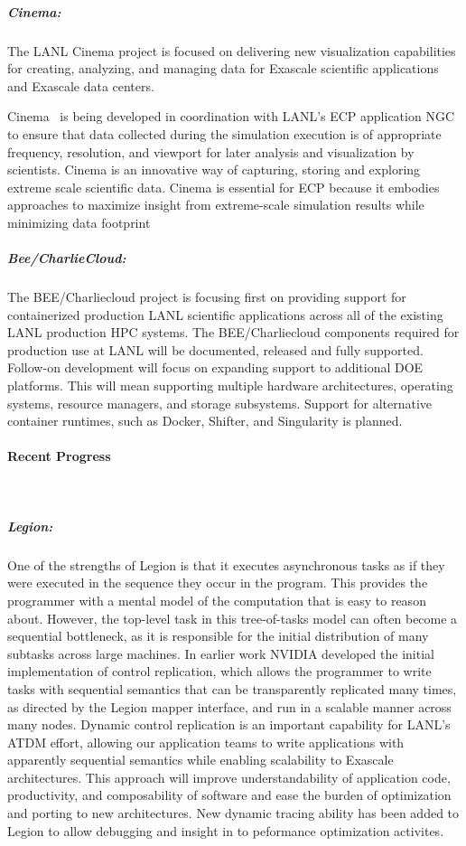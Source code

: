 \subparagraph{Cinema:}
The LANL Cinema project is focused on delivering new
visualization capabilities for creating, analyzing, and managing data for
Exascale scientific applications and Exascale data centers.

Cinema~\cite{cinema:Ahrens:SC14} is being developed in coordination with
LANL's ECP application NGC to ensure that data collected during the simulation
execution is of appropriate frequency, resolution, and viewport for later
analysis and visualization by scientists. Cinema is an innovative way of
capturing, storing and exploring extreme scale scientific data. Cinema is
essential for ECP because it embodies approaches to maximize insight from
extreme-scale simulation results while minimizing data footprint 

\subparagraph{Bee/CharlieCloud:}
The BEE/Charliecloud project is focusing first on providing support for
containerized production LANL scientific applications across all of the
existing LANL production HPC systems.  The BEE/Charliecloud components required
for production use at LANL will be documented, released and fully supported.
Follow-on development will focus on expanding support to additional DOE
platforms.  This will mean supporting multiple hardware architectures,
operating systems, resource managers, and storage subsystems.  Support for
alternative container runtimes, such as Docker, Shifter, and Singularity is
planned.

\paragraph{Recent Progress} \leavevmode \\

\subparagraph{Legion:} 
One of the strengths of Legion is that it executes asynchronous tasks as if they were executed in the sequence they occur in the program. This provides the programmer with a mental model of the computation that is easy to reason about. However, the top-level task in this tree-of-tasks model can often become a sequential bottleneck, as it is responsible for the initial distribution of many subtasks across large machines. In earlier work NVIDIA developed the initial implementation of control replication, which allows the programmer to write tasks with sequential semantics that can be  transparently replicated many times, as directed by the Legion mapper interface, and run in a scalable manner across many nodes.
Dynamic control replication is an important capability for LANL's ATDM effort, allowing our application teams to write applications with apparently sequential semantics while enabling scalability to Exascale architectures. This approach will improve understandability of application code, productivity, and composability of software and ease the burden of optimization and porting to new architectures. 
New dynamic tracing ability has been added to Legion to allow debugging and insight in to peformance optimization activites.

